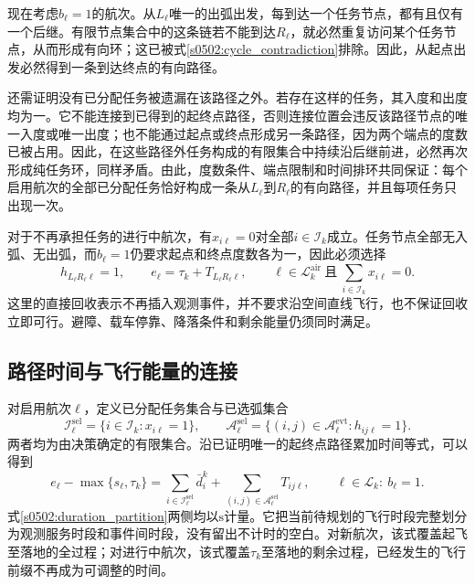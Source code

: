 现在考虑$b_\ell=1$的航次。从$L_\ell$唯一的出弧出发，每到达一个任务节点，都有且仅有一个后继。有限节点集合中的这条链若不能到达$R_\ell$，就必然重复访问某个任务节点，从而形成有向环；这已被式\eqref{s0502:cycle_contradiction}排除。因此，从起点出发必然得到一条到达终点的有向路径。

还需证明没有已分配任务被遗漏在该路径之外。若存在这样的任务，其入度和出度均为一。它不能连接到已得到的起终点路径，否则连接位置会违反该路径节点的唯一入度或唯一出度；也不能通过起点或终点形成另一条路径，因为两个端点的度数已被占用。因此，在这些路径外任务构成的有限集合中持续沿后继前进，必然再次形成纯任务环，同样矛盾。由此，度数条件、端点限制和时间排环共同保证：每个启用航次的全部已分配任务恰好构成一条从$L_\ell$到$R_\ell$的有向路径，并且每项任务只出现一次。

对于不再承担任务的进行中航次，有$x_{i\ell}=0$对全部$i\in\mathcal I_k$成立。任务节点全部无入弧、无出弧，而$b_\ell=1$仍要求起点和终点度数各为一，因此必须选择
\begin{equation}
 h_{L_\ell R_\ell\ell}=1,
 \qquad
 e_\ell=\tau_k+T_{L_\ell R_\ell\ell},
 \qquad \ell\in\mathcal L_k^{\mathrm{air}}
 \ \text{且}\ \sum_{i\in\mathcal I_k}x_{i\ell}=0.
 \label{s0502:direct_return}
\end{equation}
这里的直接回收表示不再插入观测事件，并不要求沿空间直线飞行，也不保证回收立即可行。避障、载车停靠、降落条件和剩余能量仍须同时满足。

\subsection{路径时间与飞行能量的连接}

对启用航次$\ell$，定义已分配任务集合与已选弧集合
\begin{equation}
 \mathcal I_\ell^{\mathrm{sel}}
 =\{i\in\mathcal I_k:x_{i\ell}=1\},
 \qquad
 \mathcal A_\ell^{\mathrm{sel}}
 =\{(i,j)\in\mathcal A_\ell^{\mathrm{evt}}:h_{ij\ell}=1\}.
 \label{s0502:selected_sets}
\end{equation}
两者均为由决策确定的有限集合。沿已证明唯一的起终点路径累加时间等式，可以得到
\begin{equation}
 e_\ell-\max\{s_\ell,\tau_k\}
 =\sum_{i\in\mathcal I_\ell^{\mathrm{sel}}}\bar d_i^k
  +\sum_{(i,j)\in\mathcal A_\ell^{\mathrm{sel}}}T_{ij\ell},
 \qquad \ell\in\mathcal L_k:\ b_\ell=1.
 \label{s0502:duration_partition}
\end{equation}
式\eqref{s0502:duration_partition}两侧均以$\mathrm{s}$计量。它把当前待规划的飞行时段完整划分为观测服务时段和事件间时段，没有留出不计时的空白。对新航次，该式覆盖起飞至落地的全过程；对进行中航次，该式覆盖$\tau_k$至落地的剩余过程，已经发生的飞行前缀不再成为可调整的时间。

